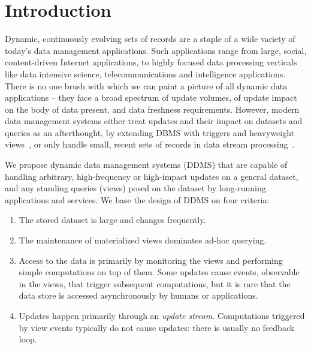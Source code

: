 


\section{Introduction}
\label{sec:intro}


Dynamic, continuously evolving sets of records are a staple of a wide variety of
today's data management applications. Such applications range from large,
social, content-driven Internet applications, to highly focused data processing
verticals like data intensive science, telecommunications and intelligence
applications. There is no one brush with which we can paint a picture of all
dynamic data applications -- they face a broad spectrum of update volumes, of
update impact on the body of data present, and data freshness requirements.
However, modern data management systems either treat updates and their impact on
datasets and queries as an afterthought, by extending DBMS with triggers and
heavyweight views~\cite{griffin-sigmod:95, bello-vldb:98, zhou-vldb:07,
zhou-icde:07}, or only handle small, recent sets of records in data stream
processing~\cite{abadi-vldbj:03, demers-sigmod:07, motwani-cidr:03,
chandrasekaran-cidr:03}.

We propose dynamic data management systems (DDMS) that are capable of handling
arbitrary, high-frequency or high-impact updates on a general dataset,
and any standing queries (views) posed on the dataset by long-running
applications and services. We base the design of DDMS on four criteria:

\begin{enumerate}
\item
The stored dataset is large and changes frequently.

\item 
The
maintenance of materialized views dominates ad-hoc querying.

\item
Access to the data is primarily by monitoring the views and performing
simple computations on top of them.
Some updates cause events, observable in the views, that trigger subsequent
computations, but it is rare that the data store is accessed asynchronously by
humans or applications.

\item
Updates happen primarily through an {\em update stream}\/. Computations
triggered by view events typically do not cause updates: there is usually no
feedback loop.
\end{enumerate}

